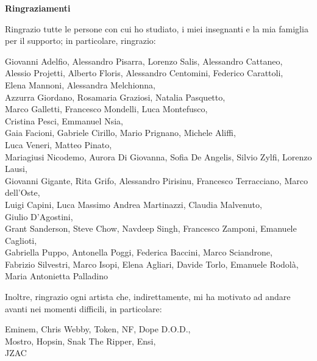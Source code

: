 \documentclass[a4paper,12pt]{article}
\numberwithin{equation}{section}
\numberwithin{figure}{section}
\numberwithin{table}{section}
\begin{document}
\newpage
\begin{center}
  {\large\bfseries\color{coverblue} Ringraziamenti}\\[0.6cm]

  \parbox{0.92\textwidth}{%
    \centering
    Ringrazio tutte le persone con cui ho studiato, i miei insegnanti e la mia
    famiglia per il supporto; in particolare, ringrazio:
  }

  \vspace{0.5cm}

  Giovanni Adelfio, Alessandro Pisarra, Lorenzo Salis, Alessandro Cattaneo,\\
  Alessio Projetti, Alberto Floris, Alessandro Centomini, Federico Carattoli,\\
  Elena Mannoni, Alessandra Melchionna,\\
  Azzurra Giordano, Rosamaria Graziosi, Natalia Pasquetto,\\
  Marco Galletti, Francesco Mondelli, Luca Montefusco,\\
  Cristina Pesci, Emmanuel Nsia,\\
  Gaia Facioni, Gabriele Cirillo, Mario Prignano, Michele Aliffi,\\
  Luca Veneri, Matteo Pinato,\\
  Mariagiusi Nicodemo, Aurora Di Giovanna, Sofia De Angelis, Silvio Zylfi, Lorenzo Lausi,\\
  Giovanni Gigante, Rita Grifo, Alessandro Pirisinu, Francesco Terracciano, Marco dell'Oste,\\
  Luigi Capini, Luca Massimo Andrea Martinazzi, Claudia Malvenuto,\\
  Giulio D'Agostini,\\
  Grant Sanderson, Steve Chow, Navdeep Singh, Francesco Zamponi, Emanuele Caglioti,\\
  Gabriella Puppo, Antonella Poggi, Federica Baccini, Marco Sciandrone,\\
  Fabrizio Silvestri, Marco Isopi, Elena Agliari, Davide Torlo, Emanuele Rodol\`a,\\
  Maria Antonietta Palladino

  \vspace{0.8cm}

  \parbox{0.92\textwidth}{%
    \centering
    Inoltre, ringrazio ogni artista che, indirettamente, mi ha
    motivato ad andare avanti nei momenti difficili, in particolare:
  }

  \vspace{0.5cm}

  Eminem, Chris Webby, Token, NF, Dope D.O.D.,\\
  Mostro, Hopsin, Snak The Ripper, Ensi,\\
  JZAC
\end{center}
\end{document}
